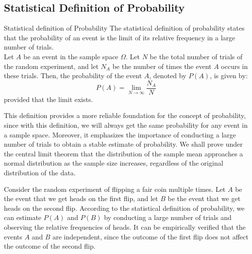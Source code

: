 \documentclass[openany]{book}
\begin{document}
\subsection{Statistical Definition of Probability}
\begin{mydefinition}{Statistical definition of Probability}
    The statistical definition of probability states that the probability of an event is the limit of its relative frequency in a large number of trials. \\
    Let $A$ be an event in the sample space $\Omega$. Let $N$ be the total number of trials of the random experiment, and let $N_A$ be the number of times the event $A$ occurs in these trials. Then, the probability of the event $A$, denoted by $P(A)$, is given by:
    $$P(A) = \lim_{N \to \infty} \frac{N_A}{N}$$
    provided that the limit exists.
\end{mydefinition}
\begin{mynote}
    This definition provides a more reliable foundation for the concept of probability, since with this definition, we will always get the same probability for any event in a sample space. Moreover, it emphasizes the importance of conducting a large number of trials to obtain a stable estimate of probability. We shall prove under the central limit theorem that the distribution of the sample mean approaches a normal distribution as the sample size increases, regardless of the original distribution of the data.
\end{mynote}
\begin{example}
    Consider the random experiment of flipping a fair coin multiple times. Let $A$ be the event that we get heads on the first flip, and let $B$ be the event that we get heads on the second flip. According to the statistical definition of probability, we can estimate $P(A)$ and $P(B)$ by conducting a large number of trials and observing the relative frequencies of heads. It can be empirically verified that the events $A$ and $B$ are independent, since the outcome of the first flip does not affect the outcome of the second flip.
\end{example}
\end{document}
